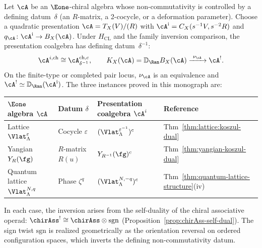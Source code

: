 \begin{theorem}
\label{thm:e1-inversion-principle}
Let $\cA$ be an $\Eone$-chiral algebra whose non-commutativity
is controlled by a defining datum~$\delta$
\textup{(}an $R$-matrix, a 2-cocycle, or a deformation parameter\textup{)}.
Choose a quadratic presentation
$\cA=T_X(V)/(R)$ with
$\cA^{\mathrm i}=C_X(s^{-1}V,s^{-2}R)$ and
$q_\cA\colon\cA^{\mathrm i}\to B_X(\cA)$.  Under
$H_{\mathrm{CL}}$ and the family inversion comparison, the
presentation coalgebra has defining datum~$\delta^{-1}$:
\begin{equation}\label{eq:e1-inversion}
\cA^{i,\mathrm{ch}} \cong \cA_{\delta^{-1}}^{\mathrm{ch},c},
\qquad
K_X(\cA)=\mathbb D_{\Ran}B_X(\cA)
\xrightarrow{\ \nu_\cA\ }\cA^!.
\end{equation}
On the finite-type or completed pair locus, $\nu_\cA$ is an
equivalence and
$\cA^!\simeq\mathbb D_{\Ran}(\cA^{\mathrm i})$.
The three instances proved in this monograph are:
\begin{center}
\renewcommand{\arraystretch}{1.4}
\begin{tabular}{l l l l}
\textbf{$\Eone$ algebra $\cA$} & \textbf{Datum $\delta$}
 & \textbf{Presentation coalgebra $\cA^i$}
 & \textbf{Reference} \\
\hline
Lattice $\Vlat_\Lambda^\varepsilon$
 & Cocycle $\varepsilon$
 & $(\Vlat_\Lambda^{\varepsilon^{-1}})^c$
 & Thm~\ref{thm:lattice:koszul-dual} \\
Yangian $Y_R(\fg)$
 & $R$-matrix $R(u)$
 & $Y_{R^{-1}}(\fg)^c$
 & Thm~\ref{thm:yangian-koszul-dual} \\
Quantum lattice $\Vlat_\Lambda^{N,q}$
 & Phase $\zeta^q$
 & $(\Vlat_\Lambda^{N,-q})^c$
 & Thm~\ref{thm:quantum-lattice-structure}(iv)
\end{tabular}
\end{center}

\noindent
In each case, the inversion arises from the self-duality of the
chiral associative operad:
${\chirAss}^! \cong \chirAss \otimes \mathrm{sgn}$
\textup{(}Proposition~\textup{\ref{prop:chirAss-self-dual})}.
The sign twist $\mathrm{sgn}$ is realized geometrically as the
orientation reversal on ordered configuration spaces, which
inverts the defining non-commutativity datum.
\end{theorem}

